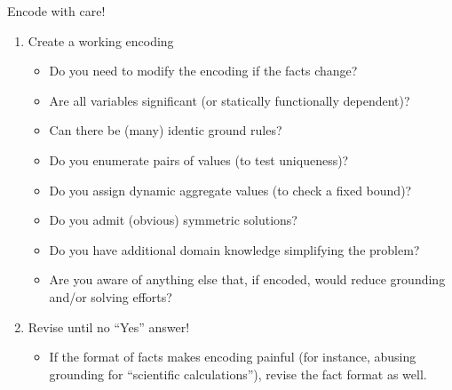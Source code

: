 \begin{frame}{Encode with care!}
  \begin{enumerate}
  \item Create a \alert<1>{working} encoding
    \begin{itemize}
    \item<2-> Do you need to modify the encoding if the facts change?
    \item<2-> Are all variables significant (or statically functionally dependent)?
    \item<2-> Can there be (many) identic ground rules?
    \item<2-> Do you enumerate pairs of values (to test uniqueness)?
    \item<2-> Do you assign dynamic aggregate values (to check a fixed bound)?
    \item<2-> Do you admit (obvious) symmetric solutions?
    \item<3-> Do you have additional domain knowledge simplifying the problem?
    \item<4-> Are you aware of anything else that, if encoded, would reduce grounding and/or solving efforts?
    \end{itemize}
  \item<1-> \alert<5>{Revise until no ``Yes'' answer!}
    \begin{itemize}
    \item<6-> \alert<6>{If the format of facts makes encoding painful
                        (for instance,
                        abusing grounding for ``scientific calculations''),
                        revise the fact format as well.}
    \end{itemize}
  \end{enumerate}
\end{frame}
